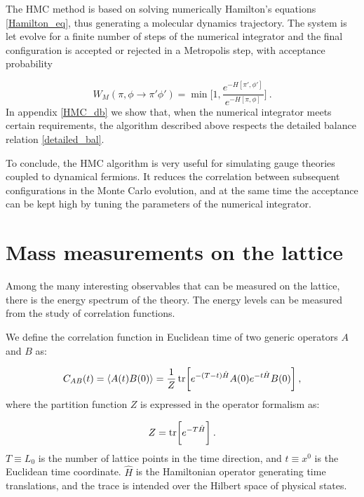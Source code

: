 The HMC method is based on solving numerically Hamilton's equations \ref{Hamilton_eq}, thus generating a molecular dynamics trajectory. The system is let evolve for a finite number of steps of the numerical integrator and the final configuration is accepted or rejected in a Metropolis step, with acceptance probability 

\begin{equation}
W_M(\pi, \phi \to \pi' \phi') = \min \biggl[ 1, \frac{e^{-H[\pi',\phi']}}{e^{-H[\pi,\phi]}} \biggr] \: .
\end{equation}
%
In appendix \ref{HMC_db} we show that, when the numerical integrator meets certain requirements, the algorithm  described above respects the detailed balance relation \ref{detailed_bal}.

To conclude, the HMC algorithm is very useful for simulating gauge theories coupled to dynamical fermions. It reduces the correlation between subsequent configurations in the Monte Carlo evolution, and at the same time the acceptance can be kept high by tuning the parameters of the numerical integrator.



\section{Mass measurements on the lattice}
\label{mass_measurements}

Among the many interesting observables that can be measured on the lattice, there is the energy spectrum of the theory. The energy levels can be measured from the study of correlation functions. 

We define the correlation function in Euclidean time of two generic operators $A$ and $B$ as:

\begin{equation}
C_{AB}(t) = \langle A(t) B(0) \rangle = \frac{1}{Z} \tr \biggl[ e^{-(T-t)\hat H} A(0) e^{-t \hat H} B(0) \biggr] \: ,
\label{corr_1}
\end{equation}
%
where the partition function $Z$ is expressed in the operator formalism as:

\begin{equation}
Z = \tr \biggl[ e^{-T \hat H} \biggr] \: .
\label{corr_2}
\end{equation}
%
$T \equiv L_0$ is the number of lattice points in the time direction, and $t \equiv x^0$ is the Euclidean time coordinate. $\hat H$ is the Hamiltonian operator generating time translations, and the trace is intended over the Hilbert space of physical states.

